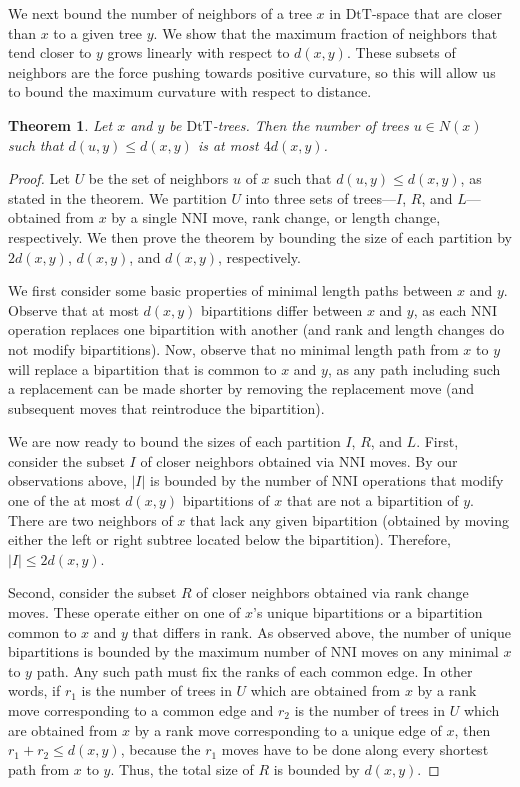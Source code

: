 \documentclass{amsart}
\newtheorem{theorem}[lemma]{Theorem}
\newcommand{\dts}{\mathrm{DtT}}
\begin{document}
We next bound the number of neighbors of a tree $x$ in $\dts$-space that are closer than $x$ to a given tree $y$.
We show that the maximum fraction of neighbors that tend closer to $y$ grows linearly with respect to $d(x,y)$.
These subsets of neighbors are the force pushing towards positive curvature, so this will allow us to bound the maximum curvature with respect to distance.

\begin{theorem}
\label{max_good_neighbors}
Let $x$ and $y$ be $\dts$-trees.
Then the number of trees $u \in N(x)$ such that $d(u, y) \le d(x, y)$ is at most $4d(x,y)$.
\end{theorem}
\begin{proof}
Let $U$ be the set of neighbors $u$ of $x$ such that $d(u,y) \le d(x,y)$, as stated in the theorem.
We partition $U$ into three sets of trees---$I$, $R$, and $L$---obtained from $x$ by a single NNI move, rank change, or length change, respectively.
We then prove the theorem by bounding the size of each partition by $2d(x,y)$, $d(x,y)$, and $d(x,y)$, respectively.

We first consider some basic properties of minimal length paths between $x$ and $y$.  
Observe that at most $d(x,y)$ bipartitions differ between $x$ and $y$, as each NNI operation replaces one bipartition with another (and rank and length changes do not modify bipartitions).
Now, observe that no minimal length path from $x$ to $y$ will replace a bipartition that is common to $x$ and $y$, as any path including such a replacement can be made shorter by removing the replacement move (and subsequent moves that reintroduce the bipartition).

We are now ready to bound the sizes of each partition $I$, $R$, and $L$.
First, consider the subset $I$ of closer neighbors obtained via NNI moves.
By our observations above, $|I|$ is bounded by the number of NNI operations that modify one of the at most $d(x,y)$ bipartitions of $x$ that are not a bipartition of $y$.
There are two neighbors of $x$ that lack any given bipartition (obtained by moving either the left or right subtree located below the bipartition).
Therefore, $|I| \le 2d(x,y)$.

Second, consider the subset $R$ of closer neighbors obtained via rank change moves.
These operate either on one of $x$'s unique bipartitions or a bipartition common to $x$ and $y$ that differs in rank.
As observed above, the number of unique bipartitions is bounded by the maximum number of NNI moves on any minimal $x$ to $y$ path.
Any such path must fix the ranks of each common edge.
In other words, if $r_1$ is the number of trees in $U$ which are obtained from $x$ by a rank move corresponding to a common edge and $r_2$ is the number of trees in $U$ which are obtained from $x$ by a rank move corresponding to a unique edge of $x$, then $r_1 + r_2 \leq d(x,y)$, because the $r_1$ moves have to be done along every shortest path from $x$ to $y$. 
Thus, the total size of $R$ is bounded by $d(x,y)$.


\end{proof}
\end{document}
